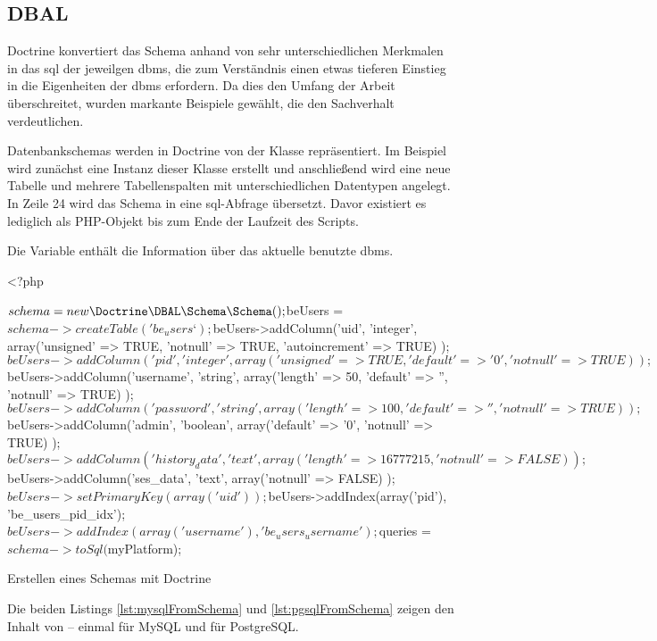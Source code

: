 \subsection{DBAL}
Doctrine konvertiert das Schema anhand von sehr unterschiedlichen Merkmalen in das \gls{sql} der jeweilgen \gls{dbms}, die zum Verständnis einen etwas tieferen Einstieg in die Eigenheiten der \gls{dbms} erfordern. Da dies den Umfang der Arbeit überschreitet, wurden markante Beispiele gewählt, die den Sachverhalt verdeutlichen.

Datenbankschemas werden in Doctrine von der Klasse  repräsentiert. Im Beispiel wird zunächst eine Instanz dieser Klasse erstellt und anschließend wird eine neue Tabelle und mehrere Tabellenspalten mit unterschiedlichen Datentypen angelegt. In Zeile 24 wird das Schema in eine \gls{sql}-Abfrage übersetzt. Davor existiert es lediglich als PHP-Objekt bis zum Ende der Laufzeit des Scripts.

Die Variable  enthält die Information über das aktuelle benutzte \gls{dbms}.

\begin{listing}[H]
\begin{phpcode}
<?php

$schema = new \Doctrine\DBAL\Schema\Schema();
$beUsers = $schema->createTable('be_users‘);
$beUsers->addColumn('uid', 'integer',
  array('unsigned' => TRUE, 'notnull' => TRUE, 'autoincrement' => TRUE)
);
$beUsers->addColumn('pid', 'integer',
  array('unsigned' => TRUE, 'default' => '0', 'notnull' => TRUE)
);
$beUsers->addColumn('username', 'string',
  array('length' => 50, 'default' => '', 'notnull' => TRUE)
);
$beUsers->addColumn('password', 'string',
  array('length' => 100, 'default' => '', 'notnull' => TRUE)
);
$beUsers->addColumn('admin', 'boolean',
  array('default' => '0', 'notnull' => TRUE)
);
$beUsers->addColumn('history_data', 'text',
  array('length' => 16777215, 'notnull' => FALSE)
);
$beUsers->addColumn('ses_data', 'text',
  array('notnull' => FALSE)
);
$beUsers->setPrimaryKey(array('uid'));
$beUsers->addIndex(array('pid'), 'be_users_pid_idx');
$beUsers->addIndex(array('username'), 'be_users_username');

$queries = $schema->toSql($myPlatform);
\end{phpcode}
\caption{Erstellen eines Schemas mit Doctrine}
\label{lst:createSchema}
\end{listing}

Die beiden Listings \ref{lst:mysqlFromSchema} und \ref{lst:pgsqlFromSchema} zeigen den Inhalt von  – einmal für MySQL und für PostgreSQL.

